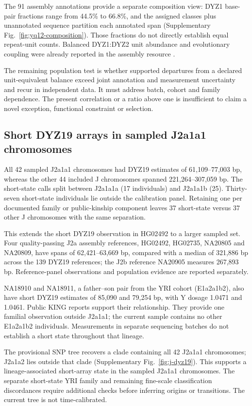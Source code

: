 \documentclass[pdflatex,sn-nature]{sn-jnl}
\begin{document}
The 91 assembly annotations provide a separate composition view: DYZ1 base-pair fractions range from 44.5\% to 66.8\%, and the assigned classes plus unannotated sequence partition each annotated span (Supplementary Fig.~\ref{fig:yq12-composition}). Those fractions do not directly establish equal repeat-unit counts. Balanced DYZ1:DYZ2 unit abundance and evolutionary coupling were already reported in the assembly resource \cite{Hallast2026}.

The remaining population test is whether supported departures from a declared unit-equivalent balance exceed joint annotation and measurement uncertainty and recur in independent data. It must address batch, cohort and family dependence. The present correlation or a ratio above one is insufficient to claim a novel exception, functional constraint or selection.

\subsection{Short DYZ19 arrays in sampled J2a1a1 chromosomes}\label{sec:res-lineages}
All 42 sampled J2a1a1 chromosomes had DYZ19 estimates of 61,109--77,003 bp, whereas the other 44 included J chromosomes spanned 221,264--307,059 bp. The short-state calls split between J2a1a1a (17 individuals) and J2a1a1b (25). Thirty-seven short-state individuals lie outside the calibration panel. Retaining one per documented family or public-kinship component leaves 37 short-state versus 37 other J chromosomes with the same separation.

This extends the short DYZ19 observation in HG02492 \cite{Hallast2023} to a larger sampled set. Four quality-passing J2a assembly references, HG02492, HG02735, NA20805 and NA20809, have spans of 62,421--63,669 bp, compared with a median of 321,886 bp across the 139 DYZ19 references; the J2b reference NA20905 measures 267,893 bp. Reference-panel observations and population evidence are reported separately.

NA18910 and NA18911, a father--son pair from the YRI cohort (E1a2a1b2), also have short DYZ19 estimates of 85,090 and 79,254 bp, with Y dosage 1.0471 and 1.0461. Public KING reports support their relationship. They provide one familial observation outside J2a1a1; the current sample contains no other E1a2a1b2 individuals. Measurements in separate sequencing batches do not establish a short state throughout that lineage.

The provisional SNP tree recovers a clade containing all 42 J2a1a1 chromosomes; J2a1a2 lies outside that clade (Supplementary Fig.~\ref{fig:j-dyz19}). This supports a lineage-associated short-array state in the sampled J2a1a1 chromosomes. The separate short-state YRI family and remaining fine-scale classification discordances require additional checks before inferring origins or transitions. The current tree is not time-calibrated.
\end{document}
